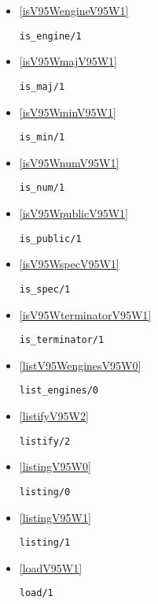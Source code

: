 \begin{itemize}
\item \ref{isV95WengineV95W1} 
\begin{verbatim}
is_engine/1
\end{verbatim}

\item \ref{isV95WmajV95W1} 
\begin{verbatim}
is_maj/1
\end{verbatim}

\item \ref{isV95WminV95W1} 
\begin{verbatim}
is_min/1
\end{verbatim}

\item \ref{isV95WnumV95W1} 
\begin{verbatim}
is_num/1
\end{verbatim}

\item \ref{isV95WpublicV95W1} 
\begin{verbatim}
is_public/1
\end{verbatim}

\item \ref{isV95WspecV95W1} 
\begin{verbatim}
is_spec/1
\end{verbatim}

\item \ref{isV95WterminatorV95W1} 
\begin{verbatim}
is_terminator/1
\end{verbatim}

\item \ref{listV95WenginesV95W0} 
\begin{verbatim}
list_engines/0
\end{verbatim}

\item \ref{listifyV95W2} 
\begin{verbatim}
listify/2
\end{verbatim}

\item \ref{listingV95W0} 
\begin{verbatim}
listing/0
\end{verbatim}

\item \ref{listingV95W1} 
\begin{verbatim}
listing/1
\end{verbatim}

\item \ref{loadV95W1} 
\begin{verbatim}
load/1
\end{verbatim}


\end{itemize}
